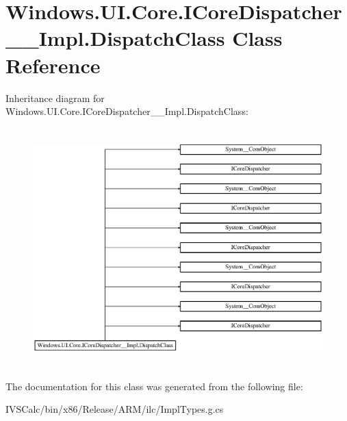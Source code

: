 \hypertarget{class_windows_1_1_u_i_1_1_core_1_1_i_core_dispatcher_____impl_1_1_dispatch_class}{}\section{Windows.\+U\+I.\+Core.\+I\+Core\+Dispatcher\+\_\+\+\_\+\+Impl.\+Dispatch\+Class Class Reference}
\label{class_windows_1_1_u_i_1_1_core_1_1_i_core_dispatcher_____impl_1_1_dispatch_class}
Inheritance diagram for Windows.\+U\+I.\+Core.\+I\+Core\+Dispatcher\+\_\+\+\_\+\+Impl.\+Dispatch\+Class\+:\begin{figure}[H]
\begin{center}
\leavevmode
\includegraphics[height=9.249249cm]{class_windows_1_1_u_i_1_1_core_1_1_i_core_dispatcher_____impl_1_1_dispatch_class}
\end{center}
\end{figure}


The documentation for this class was generated from the following file\+:\begin{DoxyCompactItemize}
\item 
I\+V\+S\+Calc/bin/x86/\+Release/\+A\+R\+M/ilc/Impl\+Types.\+g.\+cs\end{DoxyCompactItemize}
